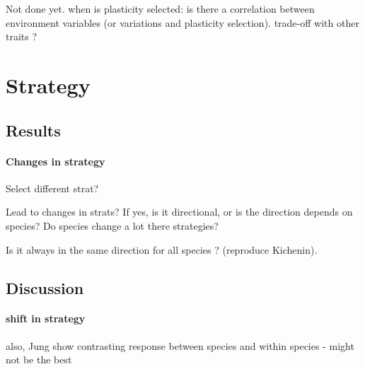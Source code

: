 Not done yet. when is plasticity selected: is there a correlation between environment variables (or variations and plasticity selection). trade-off with other traits ?

\section{Strategy}

\subsection{Results}
\paragraph{Changes in strategy}

Select different strat?

Lead to changes in strats? If yes, is it directional, or is the direction depends on species?
Do species change a lot there strategies?

Is it always in the same direction for all species ? (reproduce Kichenin).

\subsection{Discussion}
\paragraph{shift in strategy}


also, Jung \cite{jung_intraspecific_2014} show contrasting response between species and within species - might not be the best 
